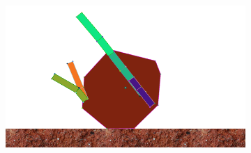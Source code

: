 \begin{figure}[H]
\begin{subfigure}[b]{0.3\textwidth}
          \includegraphics[width=\linewidth,center]{graphics/simulation-discussion/roll_3}
          \caption{\label{fig:roll_3}}
        \end{subfigure}


\end{figure}
